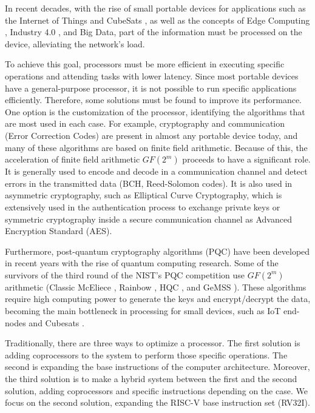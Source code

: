 In recent decades, with the rise of small portable devices for applications such as the Internet of Things \cite{5579543}
and CubeSats \cite{heidt2000cubesat}, as well as the concepts of Edge Computing \cite{7488250}, Industry 4.0 \cite{lasi2014industry}, 
and Big Data, part of the information must be processed on the device, alleviating the network's load.

To achieve this goal, processors must be more efficient in executing specific operations and attending tasks with lower latency. 
Since most portable devices have a general-purpose processor, it is not possible to run specific applications efficiently. 
Therefore, some solutions must be found to improve its performance. One option is the customization of the processor, 
identifying the algorithms that are most used in each case. For example, cryptography and communication 
(Error Correction Codes) are present in almost any portable device today, and many of these algorithms are based on finite field arithmetic.  
Because of this, the acceleration of finite field arithmetic $GF(2^m)$ proceeds to have a significant role. 
It is generally used to encode and decode in a communication channel and detect errors in the transmitted data 
(BCH, Reed-Solomon codes). It is also used in asymmetric cryptography, such as Elliptical Curve Cryptography, 
which is extensively used in the authentication process to exchange private keys or symmetric cryptography 
inside a secure communication channel as Advanced Encryption Standard (AES).


Furthermore, post-quantum cryptography algorithms (PQC) \cite{8791343} have been developed in recent years 
with the rise of quantum computing research. Some of the survivors of the third round of the NIST's PQC competition \cite{moody2016post} 
use $GF(2^m)$ arithmetic (Classic McEliece \cite{bernstein2017classic}, Rainbow \cite{10.1007/11496137_12}, HQC \cite{melchor2018hamming}, and GeMSS \cite{casanova2017gemss}). 
These algorithms require high computing power to generate the keys and encrypt/decrypt the data, 
becoming the main bottleneck in processing for small devices, such as IoT end-nodes \cite{McGinthy2018} and Cubesats \cite{Maheshwarappa2017}.


Traditionally, there are three ways to optimize a processor. The first solution is adding coprocessors 
to the system to perform those specific operations. The second is expanding the base instructions 
of the computer architecture. Moreover, the third solution is to make a hybrid system \cite{4352011} between the first and 
the second solution, adding coprocessors and specific instructions depending on the case. 
We focus on the second solution, expanding the RISC-V base instruction set (RV32I).



